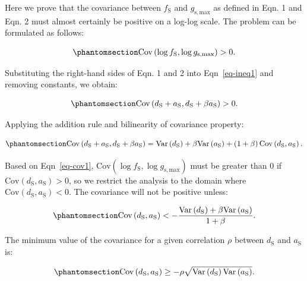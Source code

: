 \documentclass[
  letterpaper,
  DIV=11,
  numbers=noendperiod]{scrartcl}
\begin{document}
Here we prove that the covariance between \(f_\text{S}\) and
\(g_\mathrm{s,max}\) as defined in Eqn. 1 and Eqn. 2 must almost
certainly be positive on a log-log scale. The problem can be formulated
as follows:

\begin{equation}\phantomsection\label{eq-ineq1}{\text{Cov} \left(\log f_\text{S}, \log g_\mathrm{s,max} \right) > 0.}\end{equation}

Substituting the right-hand sides of Eqn. 1 and 2 into
Eqn~\ref{eq-ineq1} and removing constants, we obtain:

\begin{equation}\phantomsection\label{eq-ineq2}{\text{Cov} \left(d_\text{S} + a_\text{S}, d_\text{S} + \beta a_\text{S} \right) > 0.}\end{equation}

Applying the addition rule and bilinearity of covariance property:

\begin{equation}\phantomsection\label{eq-cov1}{\text{Cov} \left(d_\text{S} + a_\text{S}, d_\text{S} + \beta a_\text{S} \right) = \text{Var} \left( d_\text{S} \right) + \beta \text{Var} \left( a_\text{S} \right) + \left(1 + \beta \right) \text{Cov} \left(d_\text{S}, a_\text{S} \right).}\end{equation}

Based on Eqn~\ref{eq-cov1},
\(\text{Cov} \left(\log f_\text{S}, \log g_\mathrm{s,max} \right)\) must
be greater than 0 if
\(\text{Cov} \left(d_\text{S}, a_\text{S} \right) > 0\), so we restrict
the analysis to the domain where
\(\text{Cov} \left(d_\text{S}, a_\text{S} \right) < 0\). The covariance
will not be positive unless:

\begin{equation}\phantomsection\label{eq-cov2}{\text{Cov} \left(d_\text{S}, a_\text{S} \right) < -\frac{\text{Var} \left( d_\text{S} \right) + \beta \text{Var} \left( a_\text{S} \right)}{1 + \beta}.}\end{equation}

The minimum value of the covariance for a given correlation \(\rho\)
between \(d_\text{S}\) and \(a_\text{S}\) is:

\begin{equation}\phantomsection\label{eq-cov3}{\text{Cov} \left(d_\text{S}, a_\text{S} \right) \ge - \rho \sqrt{\text{Var} \left( d_\text{S} \right) \text{Var} \left( a_\text{S} \right)}.}\end{equation}
\end{document}
